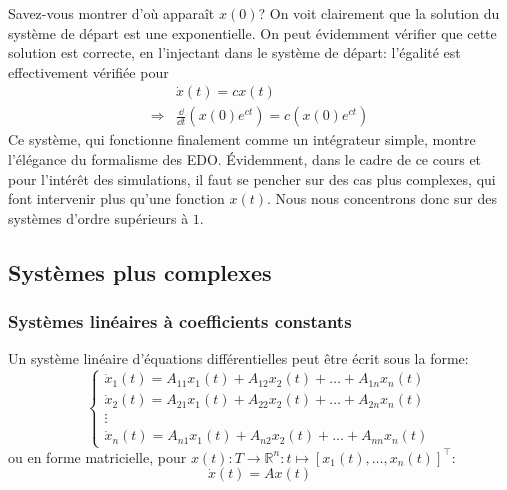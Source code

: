                 Savez-vous montrer d'où apparaît $x(0)$? On voit clairement que la solution du système de départ est une exponentielle. On peut évidemment vérifier que cette solution est correcte, en l'injectant dans le système de départ: l'égalité est effectivement vérifiée pour
                \begin{equation}
                    \begin{split}
                        &\dot{x}(t) = c x(t)\\
                        \Rightarrow& \frac{\dd}{\dd t} (x(0) e^{ct}) = c (x(0) e^{ct})
                    \end{split}
                \end{equation}
                Ce système, qui fonctionne finalement comme un intégrateur simple, montre l'élégance du formalisme des EDO. Évidemment, dans le cadre de ce cours et pour l'intérêt des simulations, il faut se pencher sur des cas plus complexes, qui font intervenir plus qu'une fonction $x(t)$. Nous nous concentrons donc sur des systèmes d'ordre supérieurs à $1$.

        \subsection{Systèmes plus complexes}
            \subsubsection{Systèmes linéaires à coefficients constants}
                Un système linéaire d'équations différentielles peut être écrit sous la forme:
                \begin{equation}
                    \begin{cases}
                    \dot{x}_1(t)=A_{11}x_1(t) + A_{12}x_2(t) + \dots + A_{1n}x_n(t) \\
                    \dot{x}_2(t)=A_{21}x_1(t) + A_{22}x_2(t) + \dots + A_{2n}x_n(t) \\
                    \vdots \\
                    \dot{x}_n(t)=A_{n1}x_1(t) + A_{n2}x_2(t) + \dots + A_{nn}x_n(t)
                    \end{cases}
                \end{equation}
                ou en forme matricielle, pour $x(t) : T \to \mathbb R^n : t \mapsto [x_1(t), \ldots, x_n(t)]^\top$:
                \begin{equation}
                    \dot{x}(t)=A x(t)
                \end{equation}
        
